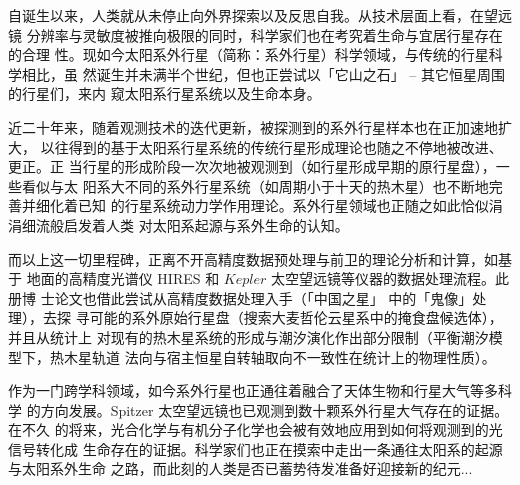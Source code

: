 \begin{preface} 

自诞生以来，人类就从未停止向外界探索以及反思自我。从技术层面上看，在望远镜
分辨率与灵敏度被推向极限的同时，科学家们也在考究着生命与宜居行星存在的合理
性。现如今太阳系外行星（简称：系外行星）科学领域，与传统的行星科学相比，虽
然诞生并未满半个世纪，但也正尝试以「它山之石」 -- 其它恒星周围的行星们，来内
窥太阳系行星系统以及生命本身。
\\ \par
近二十年来，随着观测技术的迭代更新，被探测到的系外行星样本也在正加速地扩大，
以往得到的基于太阳系行星系统的传统行星形成理论也随之不停地被改进、更正。正
当行星的形成阶段一次次地被观测到（如行星形成早期的原行星盘），一些看似与太
阳系大不同的系外行星系统（如周期小于十天的热木星）也不断地完善并细化着已知
的行星系统动力学作用理论。系外行星领域也正随之如此恰似涓涓细流般启发着人类
对太阳系起源与系外生命的认知。
\\ \par
而以上这一切里程碑，正离不开高精度数据预处理与前卫的理论分析和计算，如基于
地面的高精度光谱仪 HIRES 和 $Kepler$ 太空望远镜等仪器的数据处理流程。此册博
士论文也借此尝试从高精度数据处理入手（「中国之星」 中的「鬼像」处理），去探
寻可能的系外原始行星盘（搜索大麦哲伦云星系中的掩食盘候选体），并且从统计上
对现有的热木星系统的形成与潮汐演化作出部分限制（平衡潮汐模型下，热木星轨道
法向与宿主恒星自转轴取向不一致性在统计上的物理性质）。
\\ \par
作为一门跨学科领域，如今系外行星也正通往着融合了天体生物和行星大气等多科学
的方向发展。Spitzer 太空望远镜也已观测到数十颗系外行星大气存在的证据。在不久
的将来，光合化学与有机分子化学也会被有效地应用到如何将观测到的光信号转化成
生命存在的证据。科学家们也正在摸索中走出一条通往太阳系的起源与太阳系外生命
之路，而此刻的人类是否已蓄势待发准备好迎接新的纪元...
\end{preface}
